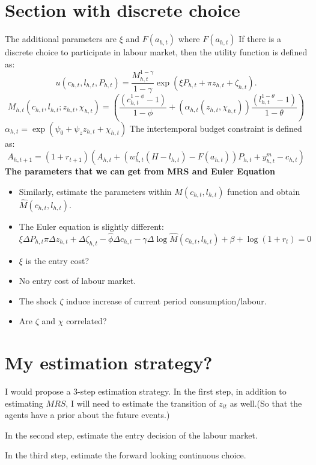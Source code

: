 \section{Section with discrete choice}
The additional parameters are $\xi$ and $F(a_{h,t})$ where $F(a_{h,t})$
If there is a discrete choice to participate in labour market, then the utility function is defined as:
\[ u(c_{h,t},l_{h,t},P_{h,t}) = \frac{M^{1-\gamma}_{h,t}}{1 - \gamma} \exp{(\xi P_{h,t} + \pi z_{h,t} + \zeta_{h,t} )} .\]
\[ M_{h,t}(c_{h,t},l_{h,t};z_{h,t},\chi_{h,t}) = \left( \frac{(c_{h,t}^{1 - \phi} - 1)}{1 - \phi} + (\alpha_{h,t}(z_{h,t},\chi_{h,t})) \frac{(l_{h,t}^{1 - \theta} -1)}{ 1 - \theta}\right) \]
$\alpha_{h,t}= \exp{(\psi_0 + \psi_z z_{h,t} + \chi_{h,t})}$
The intertemporal budget constraint is defined as:
\[ A_{h,t+1} = (1 + r_{t+1}) \left( A_{h,t} + \left(w_{h,t}^f(H-l_{h,t}) - F(a_{h,t}) \right)P_{h,t} + y_{h,t}^m - c_{h,t} \right)\]
\textbf{The parameters that we can get from MRS and Euler Equation}
\begin{itemize}
  \item Similarly, estimate the parameters within $M(c_{h,t},l_{h,t})$ function and obtain $\hat{M}(c_{h,t},l_{h,t})$.
  \item The Euler equation is slightly different: \[ \xi \Delta P_{h,t}  \pi \Delta z_{h,t} + \Delta \zeta_{h,t} - \hat{\phi} \Delta c_{h,t} - \gamma \Delta \log \hat{M}(c_{h,t},l_{h,t}) + \beta + \log(1+r_t)= 0\]
  \item $\xi$ is the entry cost?
\end{itemize}
\begin{itemize}
  \item No entry cost of labour market.
  \item The shock $\zeta$ induce increase of current period consumption/labour.
  \item Are $\zeta$ and $\chi$ correlated?
\end{itemize}

\section{My estimation strategy?}
I would propose a 3-step estimation strategy.
In the first step, in addition to estimating $MRS$, I will need to estimate the transition of $z_{it}$ as well.(So that the agents have a prior about the future events.)

In the second step, estimate the entry decision of the labour market.

In the third step, estimate the forward looking continuous choice.
